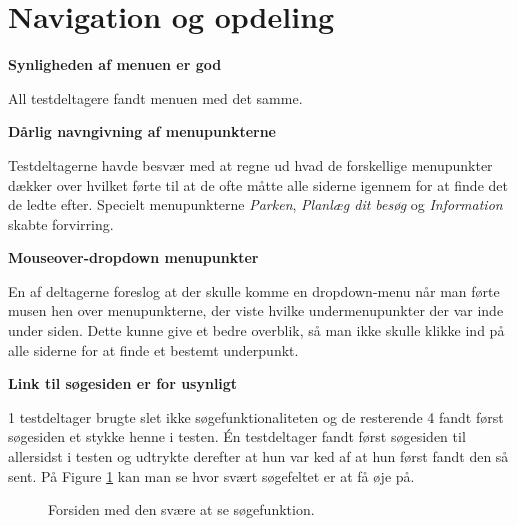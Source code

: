\documentclass[10pt,a4paper]{article}      %
\newcommand\pic[1]{\texttt{[image: Pics/\#1]}}
\renewcommand\good{\pic{good}}
\renewcommand\goodidea{\pic{goodidea}}
\renewcommand\seriousproblem{\pic{seriousproblem}}
\begin{document}
\section{Navigation og opdeling}
\begin{kommentarer}

\item[\good]{\textbf{Synligheden af menuen er god}}

All testdeltagere fandt menuen med det samme.

\item[\seriousproblem]{\textbf{Dårlig navngivning af menupunkterne}}

Testdeltagerne havde besvær med at regne ud hvad de forskellige
menupunkter dækker over hvilket førte til at de ofte måtte alle siderne igennem for at finde
det de ledte efter. Specielt menupunkterne \emph{Parken}, \emph{Planlæg dit besøg} og \emph{Information} skabte forvirring.

\item[\goodidea] \textbf{Mouseover-dropdown menupunkter}

En af deltagerne foreslog at der skulle komme en dropdown-menu når man førte musen hen over menupunkterne, der viste hvilke undermenupunkter der var inde under siden. Dette kunne give et bedre overblik, så man ikke skulle klikke ind på alle siderne for at finde et bestemt underpunkt.

\item[\seriousproblem]{\textbf{Link til søgesiden er for usynligt}}

1 testdeltager brugte slet ikke søgefunktionaliteten og de resterende 4 fandt først søgesiden
et stykke henne i testen. Én testdeltager fandt først søgesiden til allersidst i testen og
udtrykte derefter at hun var ked af at hun først fandt den så sent. På Figure \ref {fig:forside} kan man se hvor svært søgefeltet er at få øje på.

\begin{figure}[htbp]
    \centering
    \caption{Forsiden med den svære at se søgefunktion.}
    \label{fig:forside}
\end{figure}


\end{kommentarer}
\end{document}
